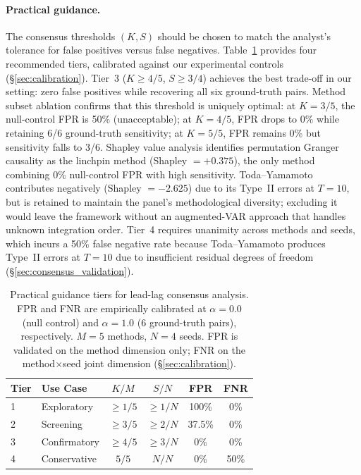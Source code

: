 \paragraph{Practical guidance.}
The consensus thresholds $(K, S)$ should be chosen to match the analyst's tolerance for false positives versus false negatives.
Table~\ref{tab:practical_guidance} provides four recommended tiers, calibrated against our experimental controls (\S\ref{sec:calibration}).
Tier~3 ($K{\geq}4/5$, $S{\geq}3/4$) achieves the best trade-off in our setting: zero false positives while recovering all six ground-truth pairs.
Method subset ablation confirms that this threshold is uniquely optimal: at $K{=}3/5$, the null-control FPR is 50\% (unacceptable); at $K{=}4/5$, FPR drops to 0\% while retaining 6/6 ground-truth sensitivity; at $K{=}5/5$, FPR remains 0\% but sensitivity falls to 3/6.
Shapley value analysis identifies permutation Granger causality as the linchpin method (Shapley $= +0.375$), the only method combining 0\% null-control FPR with high sensitivity.
Toda--Yamamoto contributes negatively (Shapley $= -2.625$) due to its Type~II errors at $T{=}10$, but is retained to maintain the panel's methodological diversity; excluding it would leave the framework without an augmented-VAR approach that handles unknown integration order.
Tier~4 requires unanimity across methods and seeds, which incurs a 50\% false negative rate because Toda--Yamamoto produces Type~II errors at $T{=}10$ due to insufficient residual degrees of freedom (\S\ref{sec:consensus_validation}).

\begin{table}[t]
\centering
\small
\caption{Practical guidance tiers for lead-lag consensus analysis. FPR and FNR are empirically calibrated at $\alpha{=}0.0$ (null control) and $\alpha{=}1.0$ (6 ground-truth pairs), respectively. $M{=}5$ methods, $N{=}4$ seeds. FPR is validated on the method dimension only; FNR on the method${\times}$seed joint dimension (\S\ref{sec:calibration}).}
\label{tab:practical_guidance}
\begin{tabular}{llcccc}
\toprule
Tier & Use Case & $K/M$ & $S/N$ & FPR & FNR \\
\midrule
1 & Exploratory     & ${\geq}1/5$ & ${\geq}1/N$ & 100\%  & 0\%    \\
2 & Screening       & ${\geq}3/5$ & ${\geq}2/N$ & 37.5\% & 0\%    \\
3 & Confirmatory    & ${\geq}4/5$ & ${\geq}3/N$ & 0\%    & 0\%    \\
4 & Conservative    & $5/5$       & $N/N$        & 0\%    & 50\% \\
\bottomrule
\end{tabular}
\end{table}


